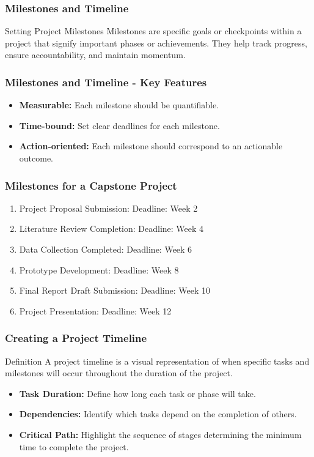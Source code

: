 \documentclass[aspectratio=169]{beamer}
\begin{document}
\begin{frame}[fragile]
    \frametitle{Milestones and Timeline}
    \begin{block}{Setting Project Milestones}
        Milestones are specific goals or checkpoints within a project that signify important phases or achievements. They help track progress, ensure accountability, and maintain momentum.
    \end{block}
\end{frame}

\begin{frame}[fragile]
    \frametitle{Milestones and Timeline - Key Features}
    \begin{itemize}
        \item \textbf{Measurable:} Each milestone should be quantifiable.
        \item \textbf{Time-bound:} Set clear deadlines for each milestone.
        \item \textbf{Action-oriented:} Each milestone should correspond to an actionable outcome.
    \end{itemize}
\end{frame}

\begin{frame}[fragile]
    \frametitle{Milestones for a Capstone Project}
    \begin{enumerate}
        \item Project Proposal Submission: Deadline: Week 2
        \item Literature Review Completion: Deadline: Week 4
        \item Data Collection Completed: Deadline: Week 6
        \item Prototype Development: Deadline: Week 8
        \item Final Report Draft Submission: Deadline: Week 10
        \item Project Presentation: Deadline: Week 12
    \end{enumerate}
\end{frame}

\begin{frame}[fragile]
    \frametitle{Creating a Project Timeline}
    \begin{block}{Definition}
        A project timeline is a visual representation of when specific tasks and milestones will occur throughout the duration of the project.
    \end{block}
    \begin{itemize}
        \item \textbf{Task Duration:} Define how long each task or phase will take.
        \item \textbf{Dependencies:} Identify which tasks depend on the completion of others.
        \item \textbf{Critical Path:} Highlight the sequence of stages determining the minimum time to complete the project.
    \end{itemize}
\end{frame}
\end{document}
